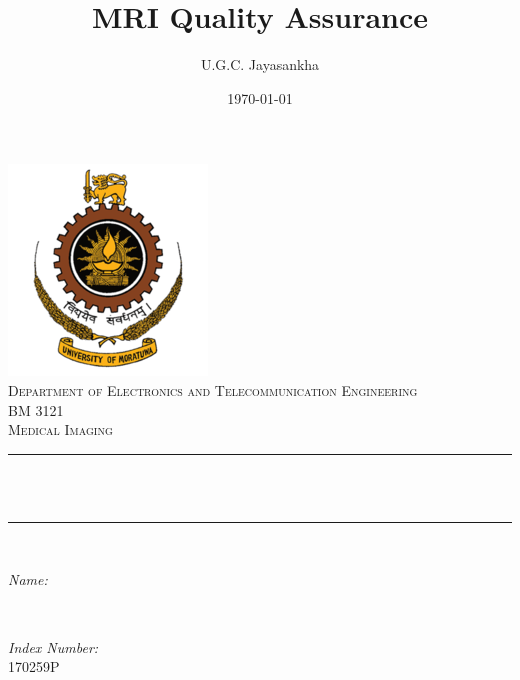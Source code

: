 \documentclass[12pt]{article}
\title{MRI Quality Assurance}					%
\author{U.G.C. Jayasankha}								%
\date{\today}											%
\makeatletter
\let\thetitle\@title
\let\theauthor\@author
\let\thedate\@date
\makeatother
\begin{document}

\begin{titlepage}
	\centering
    \vspace*{0.5 cm}
    \includegraphics[scale = 0.8]{University_of_Moratuwa_logo.png}\\[1.0 cm]	%
    \textsc{\Large Department of Electronics and Telecommunication Engineering}\\[0.8 cm]
	\textsc{\large BM 3121}\\[0.5 cm]				%
	\textsc{\Large Medical Imaging}\\[0.5 cm]				%
	\rule{\linewidth}{0.2 mm} \\[0.4 cm]
	{ \huge \bfseries \thetitle}\\
	\rule{\linewidth}{0.2 mm} \\[1.5 cm]
	
	\begin{minipage}{0.4\textwidth}
		\begin{flushleft} \large
			\emph{Name:}\\
			\theauthor
			\end{flushleft}
			\end{minipage}~
			\begin{minipage}{0.4\textwidth}
			\begin{flushright} \large
			\emph{Index Number:} \\
			170259P									%
		\end{flushright}
	\end{minipage}\\[2 cm]
	
	{\large \thedate}\\[2 cm]
 
	\vfill
	
\end{titlepage}
\end{document}
